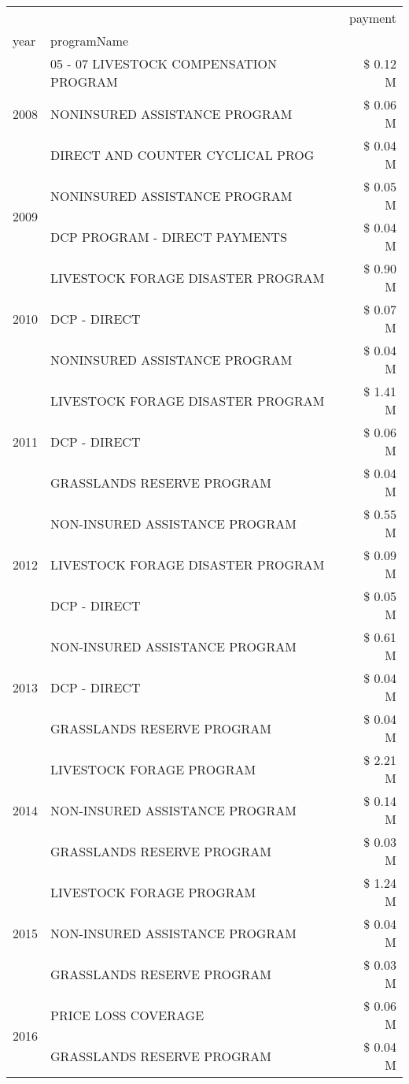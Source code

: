 \begin{tabular}{llr}
\toprule
 &  & payment \\
year & programName &  \\
\midrule
\multirow[t]{3}{*}{2008} & 05 - 07 LIVESTOCK COMPENSATION PROGRAM & \$ 0.12 M \\
 & NONINSURED ASSISTANCE PROGRAM & \$ 0.06 M \\
 & DIRECT AND COUNTER CYCLICAL PROG & \$ 0.04 M \\
\cline{1-3}
\multirow[t]{2}{*}{2009} & NONINSURED ASSISTANCE PROGRAM & \$ 0.05 M \\
 & DCP PROGRAM - DIRECT PAYMENTS & \$ 0.04 M \\
\cline{1-3}
\multirow[t]{3}{*}{2010} & LIVESTOCK FORAGE DISASTER PROGRAM & \$ 0.90 M \\
 & DCP - DIRECT & \$ 0.07 M \\
 & NONINSURED ASSISTANCE PROGRAM & \$ 0.04 M \\
\cline{1-3}
\multirow[t]{3}{*}{2011} & LIVESTOCK FORAGE DISASTER PROGRAM & \$ 1.41 M \\
 & DCP - DIRECT & \$ 0.06 M \\
 & GRASSLANDS RESERVE PROGRAM & \$ 0.04 M \\
\cline{1-3}
\multirow[t]{3}{*}{2012} & NON-INSURED ASSISTANCE PROGRAM & \$ 0.55 M \\
 & LIVESTOCK FORAGE DISASTER PROGRAM & \$ 0.09 M \\
 & DCP - DIRECT & \$ 0.05 M \\
\cline{1-3}
\multirow[t]{3}{*}{2013} & NON-INSURED ASSISTANCE PROGRAM & \$ 0.61 M \\
 & DCP - DIRECT & \$ 0.04 M \\
 & GRASSLANDS RESERVE PROGRAM & \$ 0.04 M \\
\cline{1-3}
\multirow[t]{3}{*}{2014} & LIVESTOCK FORAGE PROGRAM & \$ 2.21 M \\
 & NON-INSURED ASSISTANCE PROGRAM & \$ 0.14 M \\
 & GRASSLANDS RESERVE PROGRAM & \$ 0.03 M \\
\cline{1-3}
\multirow[t]{3}{*}{2015} & LIVESTOCK FORAGE PROGRAM & \$ 1.24 M \\
 & NON-INSURED ASSISTANCE PROGRAM & \$ 0.04 M \\
 & GRASSLANDS RESERVE PROGRAM & \$ 0.03 M \\
\cline{1-3}
\multirow[t]{3}{*}{2016} & PRICE LOSS COVERAGE & \$ 0.06 M \\
 & GRASSLANDS RESERVE PROGRAM & \$ 0.04 M \\

\end{tabular}
